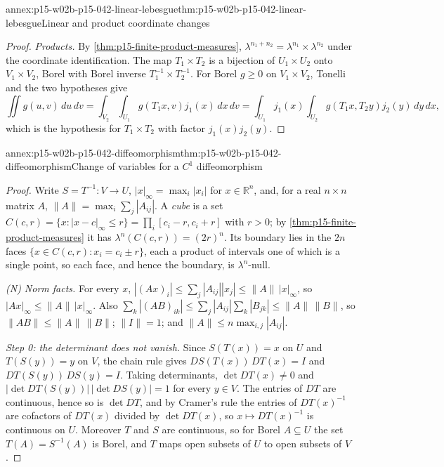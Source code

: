 \begin{annexitem}{annex:p15-w02b-p15-042-linear-lebesgue}{thm:p15-w02b-p15-042-linear-lebesgue}{Linear and product coordinate changes}
\begin{proof}
\emph{Products.} By \cref{thm:p15-finite-product-measures},
\(\lambda^{n_1+n_2}=\lambda^{n_1}\times\lambda^{n_2}\) under the coordinate
identification. The map \(T_1\times T_2\) is a bijection of
\(U_1\times U_2\) onto \(V_1\times V_2\), Borel with Borel inverse
\(T_1^{-1}\times T_2^{-1}\). For Borel \(g\geq0\) on \(V_1\times V_2\),
Tonelli and the two hypotheses give
\[
 \iint g(u,v)\,du\,dv
  =\int_{V_2}\int_{U_1}g(T_1x,v)j_1(x)\,dx\,dv
  =\int_{U_1}j_1(x)\int_{U_2}g(T_1x,T_2y)j_2(y)\,dy\,dx ,
\]
which is the hypothesis for \(T_1\times T_2\) with factor \(j_1(x)j_2(y)\).
\end{proof}
\end{annexitem}
\begin{annexitem}{annex:p15-w02b-p15-042-diffeomorphism}{thm:p15-w02b-p15-042-diffeomorphism}{Change of variables for a \(C^1\) diffeomorphism}
\begin{proof}
Write \(S=T^{-1}:V\to U\), \(|x|_\infty=\max_i|x_i|\) for
\(x\in\mathbb R^n\), and, for a real \(n\times n\) matrix \(A\),
\(\|A\|=\max_i\sum_j|A_{ij}|\). A \emph{cube} is a set
\(C(c,r)=\{x:|x-c|_\infty\leq r\}=\prod_i[c_i-r,c_i+r]\) with \(r>0\); by
\cref{thm:p15-finite-product-measures} it has
\(\lambda^n(C(c,r))=(2r)^n\). Its boundary lies in the \(2n\) faces
\(\{x\in C(c,r):x_i=c_i\pm r\}\), each a product of intervals one of which
is a single point, so each face, and hence the boundary, is
\(\lambda^n\)-null.

\emph{(N) Norm facts.} For every \(x\),
\(|(Ax)_i|\leq\sum_j|A_{ij}||x_j|\leq\|A\|\,|x|_\infty\), so
\(|Ax|_\infty\leq\|A\|\,|x|_\infty\). Also
\(\sum_k|(AB)_{ik}|\leq\sum_j|A_{ij}|\sum_k|B_{jk}|\leq\|A\|\,\|B\|\), so
\(\|AB\|\leq\|A\|\,\|B\|\); \(\|I\|=1\); and \(\|A\|\leq n\max_{i,j}|A_{ij}|\).

\emph{Step 0: the determinant does not vanish.} Since \(S(T(x))=x\) on
\(U\) and \(T(S(y))=y\) on \(V\), the chain rule gives
\(DS(T(x))\,DT(x)=I\) and \(DT(S(y))\,DS(y)=I\). Taking determinants,
\(\det DT(x)\neq0\) and
\(|\det DT(S(y))|\,|\det DS(y)|=1\) for every \(y\in V\). The entries of
\(DT\) are continuous, hence so is \(\det DT\), and by Cramer's rule the
entries of \(DT(x)^{-1}\) are cofactors of \(DT(x)\) divided by
\(\det DT(x)\), so \(x\mapsto DT(x)^{-1}\) is continuous on \(U\).
Moreover \(T\) and \(S\) are continuous, so for Borel \(A\subseteq U\) the
set \(T(A)=S^{-1}(A)\) is Borel, and \(T\) maps open subsets of \(U\) to
open subsets of \(V\).


\end{proof}
\end{annexitem}

